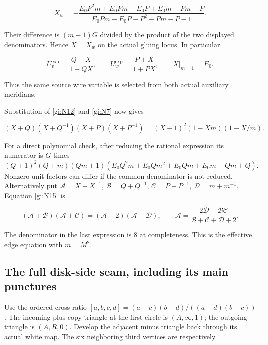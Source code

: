 \begin{equation}\label{gi:N13}
X_w=-\frac{E_0P^2m+E_0Pm+E_0P+E_0m+Pm-P}
 {E_0Pm-E_0P-P^2-Pm-P-1}.
\end{equation}

Their difference is \((m-1)G\) divided by the product of the
two displayed denominators. Hence \(X=X_w\) on the actual
gluing locus. In particular

\begin{equation}\label{gi:N14}
U_v^{\exp}=\frac{Q+X}{1+QX},\qquad
 U_w^{\exp}=\frac{P+X}{1+PX},\qquad X|_{m=1}=E_0.
\end{equation}

Thus the same source wire variable is selected from both actual
auxiliary meridians.

Substitution of \eqref{gi:N12} and \eqref{gi:N7} now gives

\begin{equation}\label{gi:N15}
(X+Q)(X+Q^{-1})(X+P)(X+P^{-1})
       =(X-1)^2(1-Xm)(1-X/m).
\end{equation}

For a direct polynomial check, after reducing the rational
expression its numerator is \(G\) times
\[
 (Q+1)^2(Q+m)(Qm+1)
       (E_0Q^2m+E_0Qm^2+E_0Qm+E_0m-Qm+Q).
\]
Nonzero unit factors can differ if the common denominator is not
reduced. Alternatively put
\(\mathcal A=X+X^{-1}\), \(\mathcal B=Q+Q^{-1}\),
\(\mathcal C=P+P^{-1}\), \(\mathcal D=m+m^{-1}\).
Equation \eqref{gi:N15} is

\begin{equation}\label{gi:N16}
(\mathcal A+\mathcal B)(\mathcal A+\mathcal C)
  =(\mathcal A-2)(\mathcal A-\mathcal D),\qquad
 \mathcal A=\frac{2\mathcal D-\mathcal B\mathcal C}
                  {\mathcal B+\mathcal C+\mathcal D+2}.
\end{equation}

The denominator in the last expression is \(8\) at completeness.
This is the effective edge equation with \(m=M^2\).

\subsection{The full disk-side seam, including its main punctures}\label{gi:the-full-disk-side-seam-including-its-main-punctures}

Use the ordered cross ratio
\([a,b,c,d]=(a-c)(b-d)/((a-d)(b-c))\).
The incoming plus-copy triangle at the first circle is
\((A,\infty,1)\); the outgoing triangle is \((A,R,0)\).
Develop the adjacent minus triangle back through its actual white
map. The six neighboring third vertices are respectively

